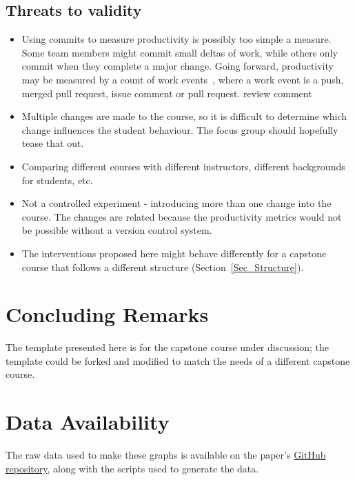 \documentclass[10pt, conference]{IEEEtran}
\begin{document}
\subsection{Threats to validity}

\begin{itemize}
    \item Using commits to measure productivity is possibly too simple a
    measure.  Some team members might commit small deltas of work, while others
    only commit when they complete a major change.  Going forward, productivity
    may be measured by a count of work
    events~\cite{saadatAnalyzingProductivityGitHub2020}, where a work event is a
    push, merged pull request, issue comment or pull request.  review comment
    \item Multiple changes are made to the course, so it is difficult to
    determine which change influences the student behaviour.  The focus group
    should hopefully tease that out.
    \item Comparing different courses with different instructors, different
    backgrounds for students, etc.
    \item Not a controlled experiment - introducing more than one change into
    the course.  The changes are related because the productivity metrics would
    not be possible without a version control system.
    \item The interventions proposed here might behave differently for a
    capstone course that follows a different structure
    (Section~\ref{Sec_Structure}).

\end{itemize}

\section{Concluding Remarks} \label{SecConclusions}

The template presented here is for the capstone course under discussion; the
template could be forked and modified to match the needs of a different capstone
course.

\section{Data Availability}
The raw data used to make these graphs is available on the paper's 
\href{REDACTED Link}{GitHub repository}, along with the scripts used to generate
the data.



\end{document}

